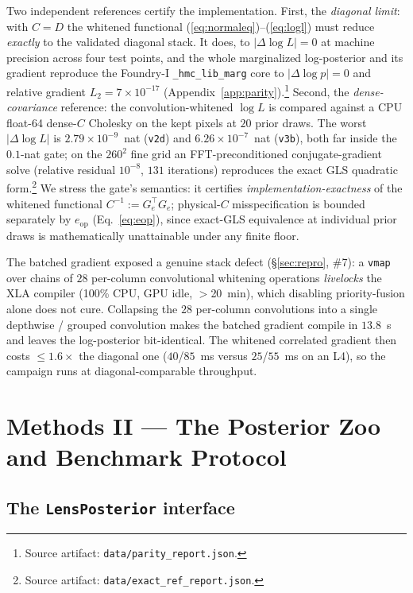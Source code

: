 \documentclass[11pt,letterpaper]{article}
\newcommand{\eop}{\ensuremath{e_{\mathrm{op}}}}
\newcommand{\art}[1]{\footnote{Source artifact: \texttt{#1}.}}
\newcommand{\dfile}[1]{\texttt{#1}}
\begin{document}
Two independent references certify the implementation. First, the {\it
diagonal limit}: with $C=D$ the whitened functional
(\ref{eq:normaleq})--(\ref{eq:logl}) must reduce {\it exactly} to the validated
diagonal stack. It does, to $|\Delta\log L|=0$ at machine precision across four
test points, and the whole marginalized log-posterior and its gradient
reproduce the Foundry-I \texttt{\_hmc\_lib\_marg} core to
$|\Delta\log p|=0$ and relative gradient $L_2 = 7\times10^{-17}$
(Appendix~\ref{app:parity}).\art{data/parity\_report.json} Second, the {\it
dense-covariance} reference: the convolution-whitened $\log L$ is compared
against a CPU float-64 dense-$C$ Cholesky on the kept pixels at $20$ prior
draws. The worst $|\Delta\log L|$ is $2.79\times10^{-9}$~nat (\dfile{v2d}) and
$6.26\times10^{-7}$~nat (\dfile{v3b}), both far inside the $0.1$-nat gate; on
the $260^2$ fine grid an FFT-preconditioned conjugate-gradient solve
(relative residual $10^{-8}$, $131$ iterations) reproduces the exact GLS
quadratic form.\art{data/exact\_ref\_report.json} We stress the gate's
semantics: it certifies {\it implementation-exactness} of the whitened
functional $C^{-1}:=G_e^{\!\top}G_e$; physical-$C$ misspecification is bounded
separately by $\eop$ (Eq.~\ref{eq:eop}), since exact-GLS equivalence at
individual prior draws is mathematically unattainable under any finite floor.

The batched gradient exposed a genuine stack defect
(\S\ref{sec:repro}, \#7): a \texttt{vmap} over chains of $28$ per-column
convolutional whitening operations {\it livelocks} the XLA compiler (100\% CPU,
GPU idle, $>$20~min), which disabling priority-fusion alone does not cure.
Collapsing the $28$ per-column convolutions into a single depthwise / grouped
convolution makes the batched gradient compile in $13.8$~s and leaves the
log-posterior bit-identical. The whitened correlated gradient then costs
$\le1.6\times$ the diagonal one ($40$/$85$~ms versus $25$/$55$~ms on an L4),
so the campaign runs at diagonal-comparable throughput.

\section{Methods II --- The Posterior Zoo and Benchmark Protocol}
\label{sec:methods2}

\subsection{The \texttt{LensPosterior} interface}
\end{document}
